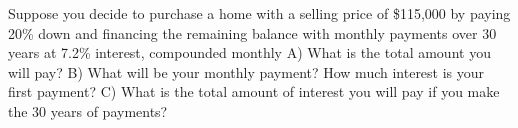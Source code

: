 \documentclass[11pt,epsfig]{article}
\begin{document}
\begin{problem}{12}
Suppose you decide to purchase a home with a selling price of \$115,000 by paying 20\% down and financing the remaining balance with monthly payments over 30 years at 7.2\% interest, compounded monthly
\newline
A) What is the total amount you will pay?
\newline
B) What will be your monthly payment? How much interest is your first payment?
\newline
C) What is the total amount of interest you will pay if you make the 30 years of payments?


\vfill
\end{problem}



\showpoints
\end{document}
